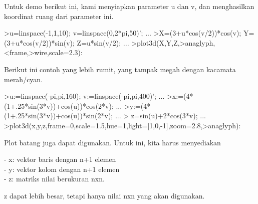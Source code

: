 \documentclass[a4paper,10pt]{article}
\begin{document}
\begin{eulernotebook}
\begin{eulercomment}
\begin{eulercomment}
\begin{eulercomment}
\begin{eulercomment}
\begin{eulercomment}
\begin{eulercomment}
\begin{eulercomment}
\begin{eulercomment}
\begin{eulercomment}
\begin{eulercomment}
\begin{eulercomment}
\begin{eulercomment}
\begin{eulercomment}
\begin{eulercomment}
\begin{eulercomment}
\begin{eulercomment}
\begin{eulercomment}
Untuk demo berikut ini, kami menyiapkan parameter u dan v, dan
menghasilkan koordinat ruang dari parameter ini.
\end{eulercomment}
\begin{eulerprompt}
>u=linspace(-1,1,10); v=linspace(0,2*pi,50)'; ...
>X=(3+u*cos(v/2))*cos(v); Y=(3+u*cos(v/2))*sin(v); Z=u*sin(v/2); ...
>plot3d(X,Y,Z,>anaglyph,<frame,>wire,scale=2.3):
\end{eulerprompt}
\begin{eulercomment}
Berikut ini contoh yang lebih rumit, yang tampak megah dengan kacamata
merah/cyan.
\end{eulercomment}
\begin{eulerprompt}
>u:=linspace(-pi,pi,160); v:=linspace(-pi,pi,400)';  ...
>x:=(4*(1+.25*sin(3*v))+cos(u))*cos(2*v); ...
>y:=(4*(1+.25*sin(3*v))+cos(u))*sin(2*v); ...
> z=sin(u)+2*cos(3*v); ...
>plot3d(x,y,z,frame=0,scale=1.5,hue=1,light=[1,0,-1],zoom=2.8,>anaglyph):
\end{eulerprompt}
\begin{eulercomment}
Plot batang juga dapat digunakan. Untuk ini, kita harus menyediakan

- x: vektor baris dengan n+1 elemen\\
- y: vektor kolom dengan n+1 elemen\\
- z: matriks nilai berukuran nxn.

z dapat lebih besar, tetapi hanya nilai nxn yang akan digunakan.


\end{eulercomment}
\end{eulercomment}
\end{eulercomment}
\end{eulercomment}
\end{eulercomment}
\end{eulercomment}
\end{eulercomment}
\end{eulercomment}
\end{eulercomment}
\end{eulercomment}
\end{eulercomment}
\end{eulercomment}
\end{eulercomment}
\end{eulercomment}
\end{eulercomment}
\end{eulercomment}
\end{eulercomment}
\end{eulernotebook}
\end{document}
